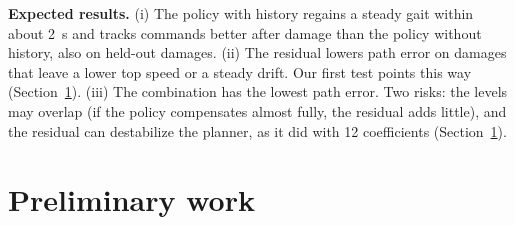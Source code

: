 \documentclass[10pt]{article}
\begin{document}
\textbf{Expected results.} (i) The policy with history regains a steady gait
within about 2~s and tracks commands better after damage than the policy
without history, also on held-out damages. (ii) The residual lowers path error
on damages that leave a lower top speed or a steady drift. Our first test
points this way (Section~\ref{sec:prelim}). (iii) The combination has the
lowest path error. Two risks: the levels may overlap (if the policy
compensates almost fully, the residual adds little), and the residual can
destabilize the planner, as it did with 12 coefficients
(Section~\ref{sec:prelim}).

\section{Preliminary work}
\label{sec:prelim}
\end{document}
